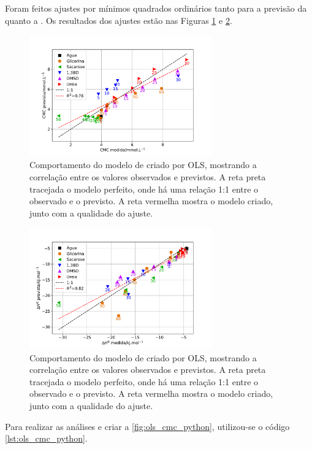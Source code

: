 		Foram feitos ajustes por mínimos quadrados ordinários tanto para a previsão da \cmc{} quanto a \DHmic. Os resultados dos ajustes estão nas Figuras \ref{fig:ols_cmc_python} e \ref{fig:ols_dh_python}.
		
		\begin{figure}[h]
			\centering
			\includegraphics[width=0.7\textwidth]{imagens/itc/ols_cmc_python}
			\caption{Comportamento do modelo de \cmc{} criado por OLS, mostrando a correlação entre os valores observados e previstos. A reta preta tracejada o modelo perfeito, onde há uma relação 1:1 entre o observado e o previsto. A reta vermelha mostra o modelo criado, junto com a qualidade do ajuste.}
			\label{fig:ols_cmc_python}
		\end{figure}
		
		\begin{figure}[h]
			\centering
			\includegraphics[width=0.7\textwidth]{imagens/itc/ols_dh_python}
			\caption{Comportamento do modelo de \DHmic{} criado por OLS, mostrando a correlação entre os valores observados e previstos. A reta preta tracejada o modelo perfeito, onde há uma relação 1:1 entre o observado e o previsto. A reta vermelha mostra o modelo criado, junto com a qualidade do ajuste.}
			\label{fig:ols_dh_python}
		\end{figure}

		Para realizar as análises e criar a \autoref{fig:ols_cmc_python}, utilizou-se o código \ref{lst:ols_cmc_python}.
		
